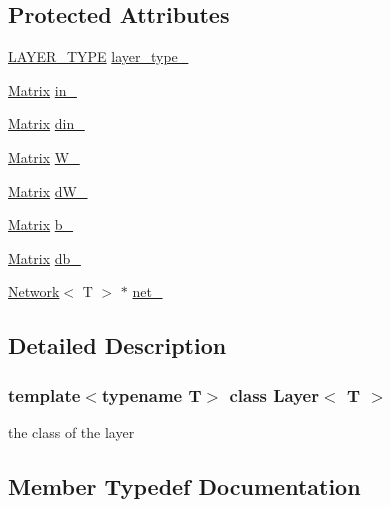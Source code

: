 \subsection*{Protected Attributes}
\begin{DoxyCompactItemize}
\item 
\mbox{\hyperlink{layer__base_8hpp_a5f7e99058765b058df158c099200b154}{L\+A\+Y\+E\+R\+\_\+\+T\+Y\+PE}} \mbox{\hyperlink{class_layer_af60ad69b5833427d6a6a4d49db902d76}{layer\+\_\+type\+\_\+}}
\item 
\mbox{\hyperlink{class_layer_a22b1e7286096aa62bd245536c8ebdaf1}{Matrix}} \mbox{\hyperlink{class_layer_a9482c992e218f5da65c4345be1dd7447}{in\+\_\+}}
\item 
\mbox{\hyperlink{class_layer_a22b1e7286096aa62bd245536c8ebdaf1}{Matrix}} \mbox{\hyperlink{class_layer_adcac12db650e05e0e5c664c304231604}{din\+\_\+}}
\item 
\mbox{\hyperlink{class_layer_a22b1e7286096aa62bd245536c8ebdaf1}{Matrix}} \mbox{\hyperlink{class_layer_a1dd882f1ce286b7d36aa4d14c815b2d3}{W\+\_\+}}
\item 
\mbox{\hyperlink{class_layer_a22b1e7286096aa62bd245536c8ebdaf1}{Matrix}} \mbox{\hyperlink{class_layer_ab02d1e3e853bef3aadffc312ba847f44}{d\+W\+\_\+}}
\item 
\mbox{\hyperlink{class_layer_a22b1e7286096aa62bd245536c8ebdaf1}{Matrix}} \mbox{\hyperlink{class_layer_ab200edbfbb0a0a7ee305d1371feb2815}{b\+\_\+}}
\item 
\mbox{\hyperlink{class_layer_a22b1e7286096aa62bd245536c8ebdaf1}{Matrix}} \mbox{\hyperlink{class_layer_a4ff69fa1c45333cbef24f12d190f26a5}{db\+\_\+}}
\item 
\mbox{\hyperlink{class_network}{Network}}$<$ T $>$ $\ast$ \mbox{\hyperlink{class_layer_a5c55f43a191e4fed38002316ca71b4ff}{net\+\_\+}}
\end{DoxyCompactItemize}


\subsection{Detailed Description}
\subsubsection*{template$<$typename T$>$\newline
class Layer$<$ T $>$}

the class of the layer 



\subsection{Member Typedef Documentation}
\mbox{\label{class_layer_a22b1e7286096aa62bd245536c8ebdaf1}} 
